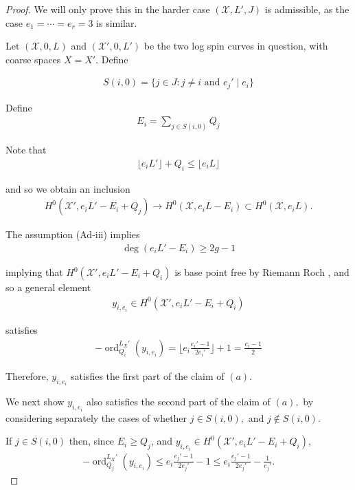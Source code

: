 \documentclass{amsart}
\theoremstyle{plain}
\theoremstyle{definition}
\theoremstyle{remark}
\numberwithin{equation}{section}
\newcommand \sx{\mathscr X}
\DeclareMathOperator{\ord}{ord}
\newcommand \subhalf[1]{\frac{{#1} - 1}{2{#1}}}
\newcommand \halfcan{L}
\begin{document}
\begin{proof}
We will only prove this in the harder case $(\sx, L', J)$ is admissible, as the case $e_1 = \cdots = e_r = 3$ is similar.

Let $(\sx, 0, L)$ and $(\sx', 0, L')$ be the two log spin curves in 
question, with coarse spaces $X = X'$. 
Define

\begin{align*}
	S(i,0) = \{j \in J : j \neq i \text{ and }e_j' \mid e_i\}
\end{align*}

\noindent
Define
\begin{align*}
	E_i = \sum_{j \in S(i,0)}^{}Q_j
\end{align*}

\noindent
Note that
\begin{align*}
	\lfloor e_i L' \rfloor + Q_i \leq \lfloor e_i L \rfloor 
\end{align*}

\noindent
and so we obtain an inclusion
\begin{align*}
	H^0(\sx', e_iL'-E_i + Q_j) \rightarrow H^0(\sx, e_iL - E_i) \subset 
H^0(\sx, e_iL).
\end{align*}

\noindent
The assumption (Ad-iii) implies
\begin{align*}
	\deg \left( e_i L' - E_i \right) \geq 2g - 1
\end{align*}

\noindent
implying that $H^0(\sx', e_iL'-E_i + Q_i)$ is base point free by 
Riemann Roch , and so a general element
\begin{align*}
	y_{i, e_i} \in H^0(\sx', e_iL'-E_i + Q_i)
\end{align*}

\noindent
satisfies
\begin{align*}
	-\ord_{Q_i}
^{\halfcan_X'}(y_{i, e_i}) = \lfloor e_i \subhalf {e_i'} \rfloor + 1 =
	\frac{e_i - 1}{2}
\end{align*}

\noindent
Therefore, $y_{i, e_i}$ satisfies the first part of the claim of $(a)$.

We next show $y_{i, e_i}$ also satisfies the second part of the
claim of $(a),$ by considering separately the cases of whether $j
\in S(i, 0),$ and $j \notin S(i,0)$.

If $j \in S(i,0)$ then, since $E_i \geq Q_j$, and $y_{i, e_i} \in H^0
(\sx', e_iL'-E_i + Q_i)$,
\begin{align*}
	-\ord_{Q_j}
^{\halfcan_X'}(y_{i, e_i}) \leq e_i\subhalf {e_j'} - 1 \leq e_i 
	\subhalf{e_j'} - \frac{1}{e_j'}.
\end{align*}


\end{proof}
\end{document}
